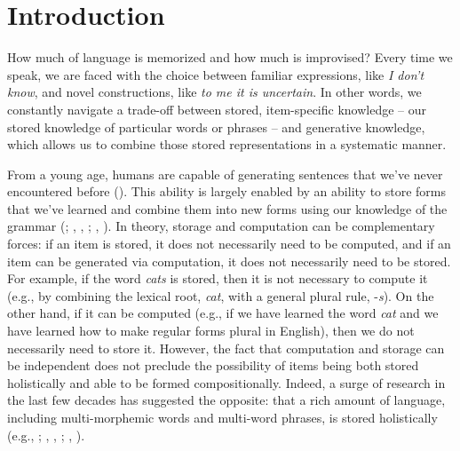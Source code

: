 \documentclass[
  12pt,
  letterpaper,
]{scrreprt}
\begin{document}

\chapter{Introduction}\label{introduction}


How much of language is memorized and how much is improvised? Every time
we speak, we are faced with the choice between familiar expressions,
like \emph{I don't know}, and novel constructions, like \emph{to me it
is uncertain}. In other words, we constantly navigate a trade-off
between stored, item-specific knowledge -- our stored knowledge of
particular words or phrases -- and generative knowledge, which allows us
to combine those stored representations in a systematic manner.

From a young age, humans are capable of generating sentences that we've
never encountered before
(). This
ability is largely enabled by an ability to store forms that we've
learned and combine them into new forms using our knowledge of the
grammar (;
,
,
;
,
). In theory,
storage and computation can be complementary forces: if an item is
stored, it does not necessarily need to be computed, and if an item can
be generated via computation, it does not necessarily need to be stored.
For example, if the word \emph{cats} is stored, then it is not necessary
to compute it (e.g., by combining the lexical root, \emph{cat}, with a
general plural rule, -\emph{s}). On the other hand, if it can be
computed (e.g., if we have learned the word \emph{cat} and we have
learned how to make regular forms plural in English), then we do not
necessarily need to store it. However, the fact that computation and
storage can be independent does not preclude the possibility of items
being both stored holistically and able to be formed compositionally.
Indeed, a surge of research in the last few decades has suggested the
opposite: that a rich amount of language, including multi-morphemic
words and multi-word phrases, is stored holistically (e.g.,
; , ,
;
,
).
\end{document}
